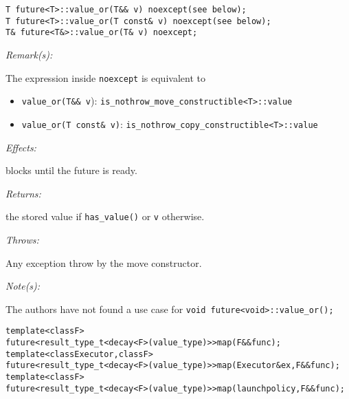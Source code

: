 \documentclass[a4paper,10pt]{article}
\newcommand{\cpp}[1]{\lstinline{#1}}
\newcommand{\wordingItem}[1]{\noindent\textit{#1:}}
\newenvironment{wordingPara}{\begin{adjustwidth}{12pt}{}}{\end{adjustwidth}}
\newenvironment{Effects}{\wordingItem{Effects}\vspace{7pt}\noindent\begin{adjustwidth}{12pt}{}}{\vspace{7pt}\end{adjustwidth}}
\newenvironment{Throws}{\wordingItem{Throws}\vspace{7pt}\noindent\begin{adjustwidth}{12pt}{}}{\vspace{7pt}\end{adjustwidth}}
\newenvironment{Returns}{\wordingItem{Returns}\vspace{7pt}\noindent\begin{adjustwidth}{12pt}{}}{\vspace{7pt}\end{adjustwidth}}
\newenvironment{Remarks}{\wordingItem{Remark(s)}\vspace{7pt}\noindent\begin{adjustwidth}{12pt}{}}{\vspace{7pt}\end{adjustwidth}}
\newenvironment{Notes}{\wordingItem{Note(s)}\vspace{7pt}\noindent\begin{adjustwidth}{12pt}{}}{\vspace{7pt}\end{adjustwidth}}
\newcommand{\update}[1]{\colorbox{update_color}{#1}}
\begin{document}
\begin{lstlisting}[xleftmargin=0pt]
T future<T>::value_or(T&& v) noexcept(see below);
T future<T>::value_or(T const& v) noexcept(see below);
T& future<T&>::value_or(T& v) noexcept;
\end{lstlisting}
\begin{wordingPara}
 
\begin{Remarks}
The expression inside \cpp{noexcept} is equivalent to
\begin{itemize}
\item \cpp{value_or(T&& v}): \cpp{is_nothrow_move_constructible<T>::value}
\item \cpp{value_or(T const& v)}: \cpp{is_nothrow_copy_constructible<T>::value}
\end{itemize}
\end{Remarks}

\begin{Effects}
blocks until the future is ready.
\end{Effects}

\begin{Returns}
the stored value if \cpp{has_value()} or \cpp{v} otherwise.
\end{Returns}

\begin{Throws}
Any exception throw by the move constructor.
\end{Throws}

\begin{Notes}
The authors have not found a use case for  \cpp{void future<void>::value_or();}
\end{Notes}

\end{wordingPara}
\begin{alltt}
\update{template<class F> }
\update{future<result_type_t<decay<F>(value_type)>> map(F&& func); }
\update{template<class Executor, class F> }
\update{future<result_type_t<decay<F>(value_type)>> map(Executor &ex, F&& func); }
\update{template<class F> }
\update{future<result_type_t<decay<F>(value_type)>> map(launch policy, F&& func);}
\end{alltt}
\end{document}
